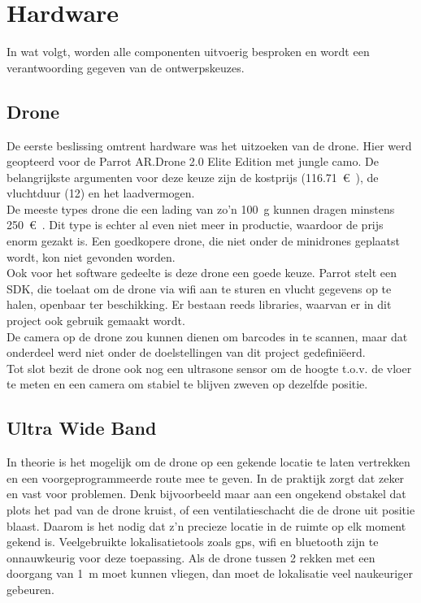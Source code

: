 \chapter{Hardware}
In wat volgt, worden alle componenten uitvoerig besproken en wordt een verantwoording gegeven van de ontwerpskeuzes.

\section{Drone} \label{sec:drone}
De eerste beslissing omtrent hardware was het uitzoeken van de drone.
Hier werd geopteerd voor de Parrot AR.Drone 2.0 Elite Edition met jungle camo.
De belangrijkste argumenten voor deze keuze zijn de kostprijs (\SI{116.71}{\euro{}}), de vluchtduur (\SI{12}{\min}) en het laadvermogen.\\

De meeste types drone die een lading van zo'n \SI{100}{\g} kunnen dragen minstens \SI{250}{\euro{}}.
Dit type is echter al even niet meer in productie, waardoor de prijs enorm gezakt is.
Een goedkopere drone, die niet onder de minidrones geplaatst wordt, kon niet gevonden worden.\\

Ook voor het software gedeelte is deze drone een goede keuze. Parrot stelt een SDK, die toelaat om de drone via wifi aan te sturen en vlucht gegevens op te halen, openbaar ter beschikking.
Er bestaan reeds libraries, waarvan er in dit project ook gebruik gemaakt wordt.\\
De camera op de drone zou kunnen dienen om barcodes in te scannen, maar dat onderdeel werd niet onder de doelstellingen van dit project gedefini\"eerd.\\
Tot slot bezit de drone ook nog een ultrasone sensor om de hoogte t.o.v. de vloer te meten en een camera om stabiel te blijven zweven op dezelfde positie.

\section{Ultra Wide Band}  \label{sec:uwb}
In theorie is het mogelijk om de drone op een gekende locatie te laten vertrekken en een voorgeprogrammeerde route mee te geven. In de praktijk zorgt dat zeker en vast voor problemen. Denk bijvoorbeeld maar aan een ongekend obstakel dat plots het pad van de drone kruist, of een ventilatieschacht die de drone uit positie blaast. Daarom is het nodig dat z'n precieze locatie in de ruimte op elk moment gekend is. Veelgebruikte lokalisatietools zoals gps, wifi en bluetooth zijn te onnauwkeurig voor deze toepassing. Als de drone tussen 2 rekken met een doorgang van \SI{1}{\m} moet kunnen vliegen, dan moet de lokalisatie veel naukeuriger gebeuren.\\

